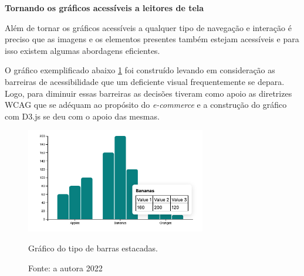 {\textbf{Tornando os gráficos acessíveis a leitores de tela}}

{Além de tornar os gráficos acessíveis a qualquer tipo de navegação e interação é preciso que as imagens e os elementos presentes também estejam acessíveis e para isso existem algumas abordagens eficientes.  

O gráfico exemplificado abaixo \ref{fig:grafico-d3} foi construído levando em consideração as barreiras de acessibilidade que um deficiente visual frequentemente se depara. Logo, para diminuir essas barreiras as decisões tiveram como apoio as diretrizes WCAG que se adéquam ao propósito do \textit{e-commerce} e a construção do gráfico com D3.js se deu com o apoio das mesmas. 


\begin{figure}[ht]
  	\center
    \includegraphics[width=0.7\textwidth]{images/barchart-tooltip.png}
    \caption{Gráfico do tipo de barras estacadas.}
    \caption*{Fonte: a autora 2022}
    \label{fig:grafico-d3}
\end{figure} 

}


